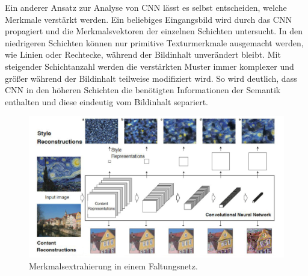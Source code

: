 \documentclass[times, 11pt,twocolumn]{article}
\begin{document}
Ein anderer Ansatz zur Analyse von CNN lässt es selbst entscheiden, welche Merkmale verstärkt werden. Ein beliebiges Eingangsbild wird durch das CNN propagiert und die Merkmalsvektoren der einzelnen Schichten untersucht. In den niedrigeren Schichten können nur primitive Texturmerkmale ausgemacht werden, wie Linien oder Rechtecke, während der Bildinhalt unverändert bleibt. Mit steigender Schichtanzahl werden die verstärkten Muster immer komplexer und größer während der Bildinhalt teilweise modifiziert wird. So wird deutlich, dass CNN in den höheren Schichten die benötigten Informationen der Semantik enthalten und diese eindeutig vom Bildinhalt separiert.\\
\begin{figure}
	\flushleft
	\includegraphics[width=\columnwidth]{Bilder/StyleRepesentation.JPG}
	\caption{Merkmalsextrahierung in einem Faltungsnetz\cite{GatysEB15a}.}
	\label{fig:StyleRepresenation}
\end{figure}
\end{document}
